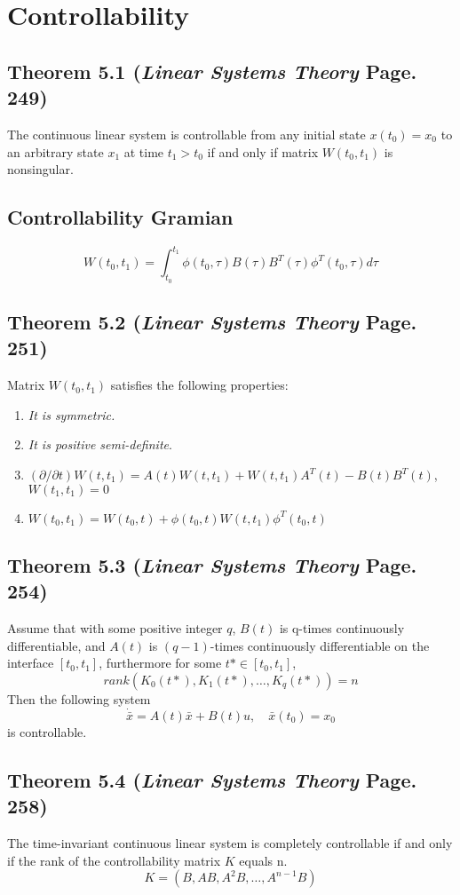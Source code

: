 \documentclass[12pt]{article}
\begin{document}
\section*{Controllability}
\subsection*{Theorem 5.1 ({\em Linear Systems Theory} Page. 249)}
The continuous linear system is controllable from any initial state $x(t_0)=x_0$ to an arbitrary state $x_1$ at time $t_1>t_0$ if and only if matrix $W(t_0,t_1)$ is nonsingular.

\subsection*{Controllability Gramian}
$$W(t_0,t_1)=\int_{t_0}^{t_1}\phi(t_0,\tau)B(\tau)B^T(\tau)\phi^T(t_0,\tau)d\tau$$

\subsection*{Theorem 5.2 ({\em Linear Systems Theory} Page. 251)}
Matrix $W(t_0,t_1)$ satisfies the following properties:
\renewcommand{\labelenumiii}{\Roman{enumii}}
\begin{enumerate}
  \item {\em It is symmetric.}
  \item {\em It is positive semi-definite}. 
  \item $(\partial/\partial t)W(t,t_1)=A(t)W(t,t_1)+W(t,t_1)A^T(t)-B(t)B^T(t)$, \\$W(t_1,t_1)=0$
  \item $W(t_0,t_1)=W(t_0,t)+\phi(t_0,t)W(t,t_1)\phi^T(t_0,t)$
\end{enumerate}

\subsection*{Theorem 5.3 ({\em Linear Systems Theory} Page. 254)}
Assume that with some positive integer $q$, $B(t)$ is q-times continuously differentiable, and $A(t)$ is $(q-1)$-times continuously differentiable on the interface $[t_0,t_1]$, furthermore for some $t*\in [t_0,t_1]$,
$$rank(K_0(t*),K_1(t*),\dots,K_q(t*))=n$$
Then the following system
$$\dot{\bar{x}}=A(t)\bar{x}+B(t)u,\quad \bar{x}(t_0)=x_0$$
is controllable. 

\subsection*{Theorem 5.4 ({\em Linear Systems Theory} Page. 258)}
The time-invariant continuous linear system is completely controllable if and only if the rank of the controllability matrix $K$ equals n.
$$K=(B,AB,A^2B,\dots,A^{n-1}B)$$
\end{document}
